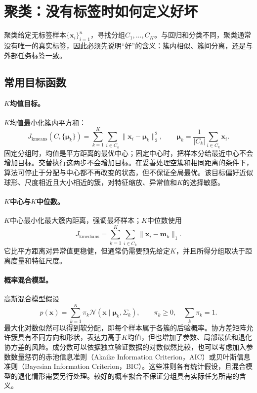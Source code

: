 \section{聚类：没有标签时如何定义好坏}
聚类给定无标签样本$\{\bm x_i\}_{i=1}^n$，寻找分组$C_1,\ldots,C_K$。与回归和分类不同，聚类通常没有唯一的真实标签，因此必须先说明“好”的含义：簇内相似、簇间分离，还是与外部任务标签一致。

\subsection{常用目标函数}
\paragraph{$K$均值目标。}
$K$均值最小化簇内平方和：
\begin{equation}
 J_{\mathrm{kmeans}}(C,\{\bm\mu_k\})=
 \sum_{k=1}^K\sum_{i\in C_k}\|\bm x_i-\bm\mu_k\|_2^2,
 \qquad
 \bm\mu_k=\frac1{|C_k|}\sum_{i\in C_k}\bm x_i.
 \label{eq:clustering-kmeans}
\end{equation}
固定分组时，均值是平方距离的最优中心；固定中心时，把样本分给最近中心不会增加目标。交替执行这两步不会增加目标。在妥善处理空簇和相同距离的条件下，算法可停止于分配与中心都不再改变的状态，但不保证全局最优。该目标偏好近似球形、尺度相近且大小相近的簇，对特征缩放、异常值和$K$的选择敏感。

\paragraph{$K$中心与$K$中位数。}
$K$中心最小化最大簇内距离，强调最坏样本；$K$中位数使用
\begin{equation}
 J_{\mathrm{kmedians}}=\sum_{k=1}^K\sum_{i\in C_k}\|\bm x_i-\bm m_k\|_1.
 \label{eq:clustering-kmedians}
\end{equation}
它比平方距离对异常值更稳健，但通常仍需要预先给定$K$，并且所得分组取决于距离度量和特征尺度。

\paragraph{概率混合模型。}
高斯混合模型假设
\begin{equation}
 p(\bm x)=\sum_{k=1}^K\pi_k\mathcal N(\bm x\mid\bm\mu_k,\Sigma_k),
 \qquad \pi_k\geq0,\quad\sum_k\pi_k=1.
 \label{eq:clustering-gmm}
\end{equation}
最大化对数似然可以得到软分配，即每个样本属于各簇的后验概率。协方差矩阵允许簇具有不同方向和形状，表达力高于$K$均值，但也增加了参数、局部最优和退化协方差的风险。成分数可以依据独立验证数据的对数似然比较，也可以考虑加入参数数量惩罚的赤池信息准则（Akaike Information Criterion，AIC）或贝叶斯信息准则（Bayesian Information Criterion，BIC）。这些准则各有统计假设，且混合模型的退化情形需要另行处理。较好的概率拟合不保证分组具有实际任务所需的含义。

